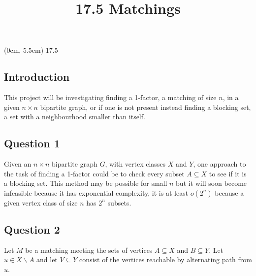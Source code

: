 \documentclass[a4paper]{article}
\title{\vspace*{2cm}17.5 Matchings\vspace*{-1.5cm}}
\date{}
\begin{document}
\maketitle

\begin{textblock*}{100mm}(0cm,-5.5cm)
\Huge 17.5
\end{textblock*}

\subsection*{Introduction}
This project will be investigating finding a 1-factor, a matching of size $n$, in a given $n \times n$ bipartite graph, or if one is not present instead finding a blocking set, a set with a neighbourhood smaller than itself.

\subsection*{Question 1}

Given an $n \times n$ bipartite graph $G$, with vertex classes $X$ and $Y$, one approach to the task of finding a 1-factor could be to check every subset $A\subseteq X$ to see if it is a blocking set. This method may be possible for small $n$ but it will soon become infeasible because it has exponential complexity, it is at least $o(2^n)$ because a given vertex class of size $n$ has $2^n$ subsets.

\subsection*{Question 2}

Let $M$ be a matching meeting the sets of vertices $A\subseteq X$ and $B\subseteq Y$. Let $u \in X\backslash A$ and let $V\subseteq Y$ consist of the vertices reachable by alternating path from $u$.
\end{document}
